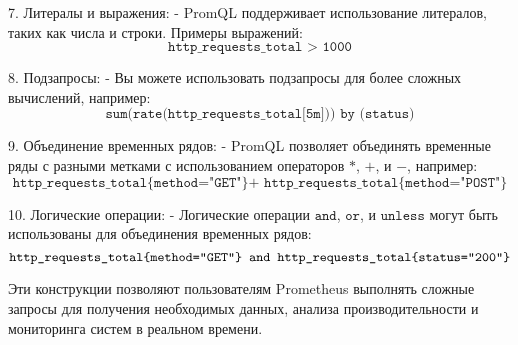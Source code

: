 7. Литералы и выражения:
- PromQL поддерживает использование литералов, таких как числа и строки. Примеры выражений:
\[
    \texttt{http\_requests\_total > 1000}
\]

8. Подзапросы:
- Вы можете использовать подзапросы для более сложных вычислений, например:
\[
    \texttt{sum(rate(http\_requests\_total[5m])) by (status)}
\]

9. Объединение временных рядов:
- PromQL позволяет объединять временные ряды с разными метками с использованием операторов \(*\), \(+\), и \(-\), например:
\[
    \texttt{http\_requests\_total\{method="GET"\} + http\_requests\_total\{method="POST"\}}
\]

10. Логические операции:
- Логические операции \(\texttt{and}\), \(\texttt{or}\), и \(\texttt{unless}\) могут быть использованы для объединения временных рядов:
\[
    \texttt{http\_requests\_total\{method="GET"\} \texttt{and} http\_requests\_total\{status="200"\}}
\]

Эти конструкции позволяют пользователям Prometheus выполнять сложные запросы для получения необходимых данных, анализа производительности и мониторинга систем в реальном времени.